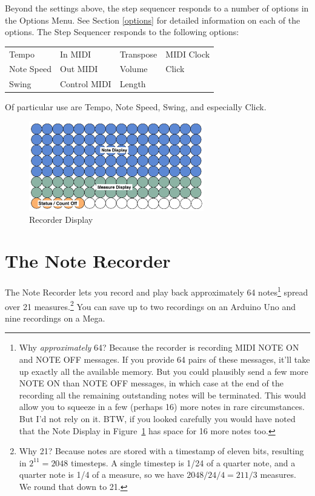 \documentclass{article}
\begin{document}
Beyond the settings above, the step sequencer responds to a number of options in the Options Menu.  See Section \ref{options} for detailed information on each of the options.  The Step Sequencer responds to the following options:

\vspace{1em}
\begin{tabular}{llll}
Tempo& 			In MIDI&		Transpose&	MIDI Clock\\
Note Speed& 		Out MIDI& 	Volume	&	Click\\
Swing& 			Control MIDI&	Length	&\\
\end{tabular}

\vspace{1em}
Of particular use are Tempo, Note Speed, Swing, and especially Click.


\begin{figure}
\vspace{-4em}\includegraphics[width=3in]{recorder.pdf}
\vspace{-2em}\caption{\small Recorder Display}\vspace{-1em}
\label{recorder}
\end{figure}

\section {The Note Recorder}

The Note Recorder lets you record and play back approximately 64 notes\footnote{Why {\it approximately} 64? Because the recorder is recording MIDI NOTE ON and NOTE OFF messages.  If you provide 64 pairs of these messages, it'll take up exactly all the available memory.  But you could plausibly send a few more NOTE ON than NOTE OFF messages, in which case at the end of the recording all the remaining outstanding notes will be terminated.  This would allow you to squeeze in a few (perhaps 16) more notes in rare circumstances.  But I'd not rely on it.  BTW, if you looked carefully you would have noted that the Note Display in Figure~\ref{recorder} has space for 16 more notes too.} spread over 21 measures.\footnote{Why 21?  Because notes are stored with a timestamp of eleven bits, resulting in \(2^11 = 2048\) timesteps.  A single timestep is 1/24 of a quarter note, and a quarter note is 1/4 of a measure, so we have \(2048 / 24 / 4 = 21 1/3\) measures.  We round that down to 21.}  You can save up to two recordings on an Arduino Uno and nine recordings on a Mega.
\end{document}
